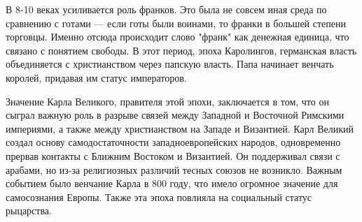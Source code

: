 В 8-10 веках усиливается роль франков. Это была не совсем иная среда по сравнению с готами — если готы были воинами, то франки в большей степени торговцы. Именно отсюда происходит слово "франк" как денежная единица, что связано с понятием свободы. В этот период, эпоха Каролингов, германская власть объединяется с христианством через папскую власть. Папа начинает венчать королей, придавая им статус императоров.

Значение Карла Великого, правителя этой эпохи, заключается в том, что он сыграл важную роль в разрыве связей между Западной и Восточной Римскими империями, а также между христианством на Западе и Византией. Карл Великий создал основу самодостаточности западноевропейских народов, одновременно прервав контакты с Ближним Востоком и Византией. Он поддерживал связи с арабами, но из-за религиозных различий тесных союзов не возникло. Важным событием было венчание Карла в 800 году, что имело огромное значение для самосознания Европы. Также эта эпоха повлияла на социальный статус рыцарства.

